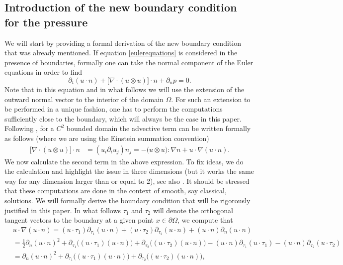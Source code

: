 \documentclass[12pt,a4paper]{article}
\theoremstyle{definition}
\theoremstyle{remark}
\numberwithin{equation}{section}
\begin{document}
\subsection{Introduction of the new boundary condition for the pressure} \label{introdboundcondition}
We will start by providing a formal derivation of the new boundary condition that was already mentioned. If equation \eqref{eulerequations} is considered in the presence of boundaries, formally one can take the normal component of the Euler equations in order to find
\begin{equation*}
\partial_t (u \cdot n) + \big[ \nabla \cdot (u \otimes u) \big] \cdot n + \partial_n p = 0.
\end{equation*}
Note that in this equation and in what follows we will use the extension of the outward normal vector to the interior of the domain $\Omega$. For such an extension to be performed in a unique fashion, one has to perform the computations sufficiently close to the boundary, which will always be the case in this paper. Following \cite{bardos2021}, for a $C^2$ bounded domain the advective term can be written formally as follows (where we are using the Einstein summation convention)
\begin{align*}
\big[ \nabla \cdot (u \otimes u) \big] \cdot n &= (u_i \partial_i u_j) n_j = - \big( u \otimes u \big) : \nabla n + u \cdot \nabla (u \cdot n). 
\end{align*}
We now calculate the second term in the above expression. To fix ideas, we do the calculation and highlight the issue in three dimensions (but it works the same way for any dimension larger than or equal to 2), see also \cite{bardos2021}. It should be stressed that these computations are done in the context of smooth, say classical, solutions. We will formally derive the boundary condition that will be rigorously justified in this paper. In what follows $\tau_1$ and $\tau_2$ will denote the orthogonal tangent vectors to the boundary at a given point $x \in \partial \Omega$, we compute that
\begin{align*}
&u \cdot \nabla (u \cdot n) = (u \cdot \tau_1) \partial_{\tau_1} (u \cdot n) + (u \cdot \tau_2) \partial_{\tau_2} (u \cdot n) + (u \cdot n) \partial_n (u \cdot n) \\
&= \frac{1}{2} \partial_n (u \cdot n)^2 + \partial_{\tau_1} \big( (u \cdot \tau_1) (u \cdot n) \big) + \partial_{\tau_2} \big( (u \cdot \tau_2) (u \cdot n) \big) - (u \cdot n) \partial_{\tau_1} (u \cdot \tau_1) - (u \cdot n) \partial_{\tau_2} (u \cdot \tau_2)  \\
&= \partial_n (u \cdot n)^2 + \partial_{\tau_1} \big( (u \cdot \tau_1) (u \cdot n) \big) + \partial_{\tau_2} \big( (u \cdot \tau_2) (u \cdot n) \big),
\end{align*}
\end{document}
